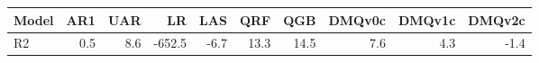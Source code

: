 \begin{tabular}{lrrrrrrrrr}
\toprule
Model & AR1 & UAR & LR & LAS & QRF & QGB & DMQv0c & DMQv1c & DMQv2c \\
\midrule
R2 & 0.5 & 8.6 & -652.5 & -6.7 & 13.3 & 14.5 & 7.6 & 4.3 & -1.4 \\
\bottomrule
\end{tabular}
